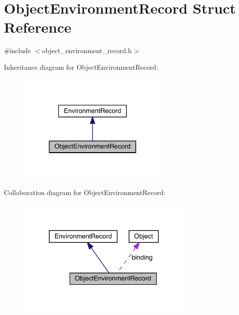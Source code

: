 \hypertarget{struct_object_environment_record}{}\section{Object\+Environment\+Record Struct Reference}
\label{struct_object_environment_record}


{\ttfamily \#include $<$object\+\_\+environment\+\_\+record.\+h$>$}



Inheritance diagram for Object\+Environment\+Record\+:
\nopagebreak
\begin{figure}[H]
\begin{center}
\leavevmode
\includegraphics[width=213pt]{struct_object_environment_record__inherit__graph}
\end{center}
\end{figure}


Collaboration diagram for Object\+Environment\+Record\+:
\nopagebreak
\begin{figure}[H]
\begin{center}
\leavevmode
\includegraphics[width=248pt]{struct_object_environment_record__coll__graph}
\end{center}
\end{figure}
